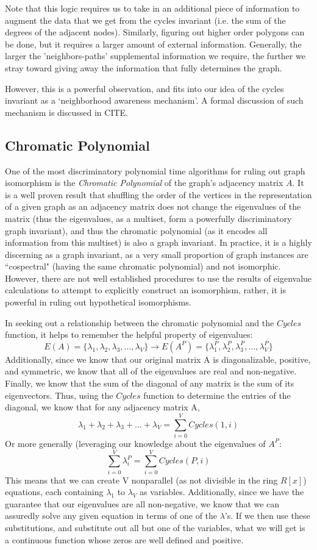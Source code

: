 Note that this logic requires us to take in an additional piece of information to augment the data that we get from the cycles invariant (i.e. the sum of the degrees of the adjacent nodes).
Similarly, figuring out higher order polygons can be done, but it requires a larger amount of external information.
Generally, the larger the 'neighbors-paths' supplemental information we require, the further we stray toward giving away the information that fully determines the graph.

However, this is a powerful observation, and fits into our idea of the cycles invariant as a `neighborhood awareness mechanism'. A formal discussion of such mechanism is discussed in CITE.

\subsection{Chromatic Polynomial}
One of the most discriminatory polynomial time algorithms for ruling out graph isomorphism is the \emph{Chromatic Polynomial} of the graph's adjacency matrix $A$.
It is a well proven result that shuffling the order of the vertices in the representation of a given graph as an adjacency matrix does not change the eigenvalues of the matrix (thus the eigenvalues, as a multiset, form a powerfully discriminatory graph invariant), and thus the chromatic polynomial (as it encodes all information from this multiset) is also a graph invariant.
In practice, it is a highly discerning as a graph invariant, as a very small proportion of graph instances are ``cospectral" (having the same chromatic polynomial) and not isomorphic.
However, there are not well established procedures to use the results of eigenvalue calculations to attempt to explicitly construct an isomorphism, rather, it is powerful in ruling out hypothetical isomorphisms. 

In seeking out a relationship between the chromatic polynomial and the $Cycles$ function, it helps to remember the helpful property of  eigenvalues:
$$E(A) = \{\lambda_1,\lambda_2,\lambda_3, \dots, \lambda_V\} \rightarrow E(A^P) = \{\lambda_1^P,\lambda_2^P,\lambda_3^P, \dots, \lambda_V^P\} $$
Additionally, since we know that our original matrix A is diagonalizable, positive, and symmetric, we know that all of the eigenvalues are real and non-negative. 
Finally, we know that the sum of the diagonal of any matrix is the sum of its eigenvectors. 
Thus, using the $Cycles$ function to determine the entries of the diagonal, we know that for any adjacency matrix A,
$$\lambda_1 + \lambda_2 + \lambda_3 + \dots + \lambda_V = \sum_{i = 0}^{V}{Cycles(1, i)}$$
Or more generally (leveraging our knowledge about the eigenvalues of $A^P$:
$$ \sum_{i = 0}^V{\lambda_i^P} =  \sum_{i = 0}^{V}{Cycles(P, i)}$$
This means that we can create V nonparallel (as not divisible in the ring $R[x]$) equations, each containing $\lambda_1$ to $\lambda_V$ as variables.
Additionally, since we have the guarantee that our eigenvalues are all non-negative, we know that we can assuredly solve any given equation in terms of one of the $\lambda$'s.
If we then use these substitutions, and substitute out all but one of the variables, what we will get is a continuous function whose zeros are well defined and positive. 

